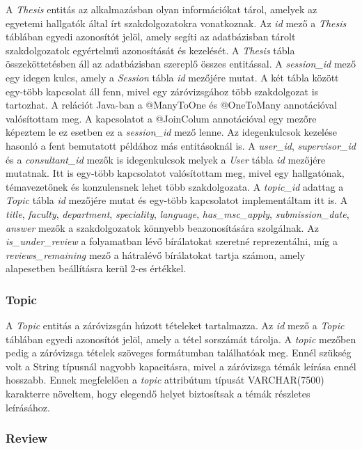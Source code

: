 A \textit{Thesis} entitás az alkalmazásban olyan információkat tárol, amelyek az egyetemi hallgatók által írt szakdolgozatokra vonatkoznak. Az \textit{id} mező a \textit{Thesis} táblában egyedi azonosítót jelöl, amely segíti az adatbázisban tárolt szakdolgozatok egyértelmű azonosítását és kezelését. A \textit{Thesis} tábla összeköttetésben áll az adatbázisban szereplő összes entitással. A \textit{session\_id} mező egy idegen kulcs, amely a \textit{Session} tábla \textit{id} mezőjére mutat. A két tábla között egy-több kapcsolat áll fenn, mivel egy záróvizsgához több szakdolgozat is tartozhat. A relációt Java-ban a @ManyToOne és @OneToMany annotációval valósítottam meg. A kapcsolatot a @JoinColum annotációval egy mezőre képeztem le ez esetben ez a \textit{session\_id} mező lenne. Az idegenkulcsok kezelése hasonló a fent bemutatott példához más entitásoknál is. A \textit{user\_id}, \textit{supervisor\_id} és a \textit{consultant\_id} mezők is idegenkulcsok melyek a \textit{User} tábla \textit{id} mezőjére mutatnak. Itt is egy-több kapcsolatot valósítottam meg, mivel egy hallgatónak, témavezetőnek és konzulensnek lehet több szakdolgozata. A \textit{topic\_id} adattag a \textit{Topic} tábla \textit{id} mezőjére mutat és egy-több kapcsolatot implementáltam itt is. A \textit{title}, \textit{faculty}, \textit{department}, \textit{speciality}, \textit{language}, \textit{has\_msc\_apply}, \textit{submission\_date}, \textit{answer} mezők a szakdolgozatok könnyebb beazonosítására szolgálnak. Az \textit{is\_under\_review} a folyamatban lévő bírálatokat szeretné reprezentálni, míg a \textit{reviews\_remaining} mező a hátralévő bírálatokat tartja számon, amely alapesetben beállításra kerül 2-es értékkel.

\subsubsection{Topic}

A \textit{Topic} entitás a záróvizsgán húzott tételeket tartalmazza. Az \textit{id} mező a \textit{Topic} táblában egyedi azonosítót jelöl, amely a tétel sorszámát tárolja. A \textit{topic} mezőben pedig a záróvizsga tételek szöveges formátumban találhatóak meg. Ennél szükség volt a String típusnál nagyobb kapacitásra, mivel a záróvizsga témák leírása ennél hosszabb. Ennek megfelelően a \textit{topic} attribútum típusát VARCHAR(7500) karakterre növeltem, hogy elegendő helyet biztosítsak a témák részletes leírásához.

\subsubsection{Review}

